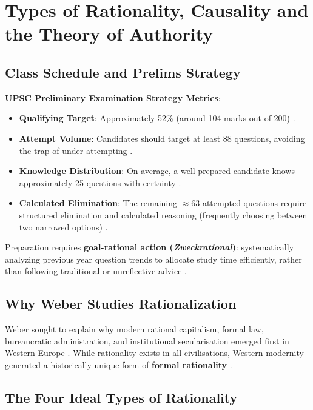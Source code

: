 \section{Types of Rationality, Causality and the Theory of Authority}

\subsection{Class Schedule and Prelims Strategy}

\begin{DataFact}
\textbf{UPSC Preliminary Examination Strategy Metrics}:
\begin{itemize}
    \item \textbf{Qualifying Target}: Approximately 52\% (around 104 marks out of 200) .
    \item \textbf{Attempt Volume}: Candidates should target at least 88 questions, avoiding the trap of under-attempting .
    \item \textbf{Knowledge Distribution}: On average, a well-prepared candidate knows approximately 25 questions with certainty .
    \item \textbf{Calculated Elimination}: The remaining $\approx 63$ attempted questions require structured elimination and calculated reasoning (frequently choosing between two narrowed options) .
\end{itemize}
\end{DataFact}

\begin{CriticalPoint}
Preparation requires \textbf{goal-rational action (\textit{Zweckrational})}: systematically analyzing previous year question trends to allocate study time efficiently, rather than following traditional or unreflective advice .
\end{CriticalPoint}

\subsection{Why Weber Studies Rationalization}

Weber sought to explain why modern rational capitalism, formal law, bureaucratic administration, and institutional secularisation emerged first in Western Europe . While rationality exists in all civilisations, Western modernity generated a historically unique form of \textbf{formal rationality} .

\subsection{The Four Ideal Types of Rationality}

